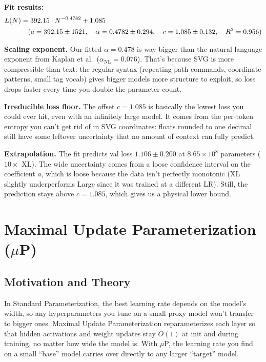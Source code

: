 \documentclass[10pt,letterpaper]{article}
\begin{document}
\textbf{Fit results:}
\begin{align}
  L(N) &= 392.15 \cdot N^{-0.4782} + 1.085 \notag \\
  &\quad (a = 392.15 \pm 1521,\quad \alpha = 0.4782 \pm 0.294,
         \quad c = 1.085 \pm 0.132,\quad R^2 = 0.956) \notag
\end{align}

\textbf{Scaling exponent.}
Our fitted $\alpha = 0.478$ is way bigger than the natural-language exponent from Kaplan et al.\ ($\alpha_\text{NL} = 0.076$). That's because SVG is more compressible than text: the regular syntax (repeating path commands, coordinate patterns, small tag vocab) gives bigger models more structure to exploit, so loss drops faster every time you double the parameter count.

\textbf{Irreducible loss floor.}
The offset $c = 1.085$ is basically the lowest loss you could ever hit, even with an infinitely large model. It comes from the per-token entropy you can't get rid of in SVG coordinates: floats rounded to one decimal still have some leftover uncertainty that no amount of context can fully predict.

\textbf{Extrapolation.}
The fit predicts val loss $1.106 \pm 0.200$ at $8.65 \times 10^8$ parameters ($10\times$ XL). The wide uncertainty comes from a loose confidence interval on the coefficient $a$, which is loose because the data isn't perfectly monotonic (XL slightly underperforms Large since it was trained at a different LR). Still, the prediction stays above $c = 1.085$, which gives us a physical lower bound.

\section{Maximal Update Parameterization ($\mu$P)}
\label{sec:mup}

\subsection{Motivation and Theory}

In Standard Parameterization, the best learning rate depends on the model's width, so any hyperparameters you tune on a small proxy model won't transfer to bigger ones. Maximal Update Parameterization reparameterizes each layer so that hidden activations and weight updates stay $O(1)$ at init and during training, no matter how wide the model is. With $\mu$P, the learning rate you find on a small ``base'' model carries over directly to any larger ``target'' model.
\end{document}
